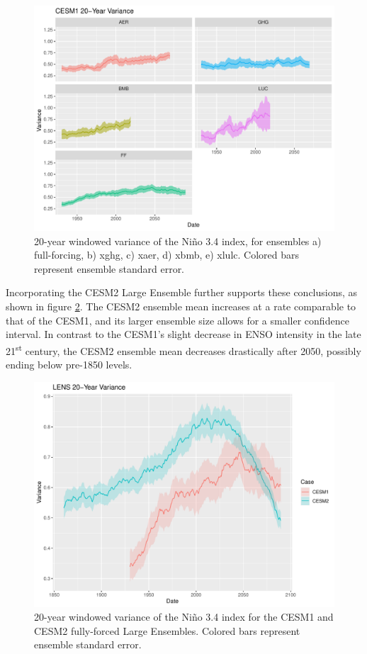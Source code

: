 \documentclass[11pt]{article}
\begin{document}
\begin{figure}[htbp]
\centering
\includegraphics[width=.9\linewidth]{../../data/figures/cesm1.pdf}
\caption{\label{fig:variance_1}20-year windowed variance of the Niño 3.4 index, for ensembles a) full-forcing, b) xghg, c) xaer, d) xbmb, e) xlulc. Colored bars represent ensemble standard error.}
\end{figure}

Incorporating the CESM2 Large Ensemble further supports these conclusions, as shown in figure \ref{fig:variance_2}. The CESM2 ensemble mean increases at a rate comparable to that of the CESM1, and its larger ensemble size allows for a smaller confidence interval. In contrast to the CESM1's slight decrease in ENSO intensity in the late 21\textsuperscript{st} century, the CESM2 ensemble mean decreases drastically after 2050, possibly ending below pre-1850 levels.

\begin{figure}[htbp]
\centering
\includegraphics[width=.9\linewidth]{../../data/figures/ff_compare.pdf}
\caption{\label{fig:variance_2}20-year windowed variance of the Niño 3.4 index for the CESM1 and CESM2 fully-forced Large Ensembles. Colored bars represent ensemble standard error.}
\end{figure}
\end{document}

